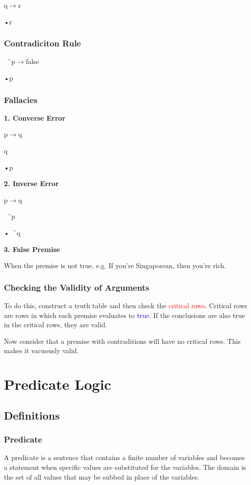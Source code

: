\documentclass{article}
\newcommand{\negation}{${\phantom{0}}^\sim$}
\begin{document}
q$\rightarrow$r

•r

\subsubsection{Contradiciton Rule}

\negation p$\rightarrow$false

•p

\subsubsection{Fallacies}
\textbf{1. Converse Error}

p$\rightarrow$q

q

•p

\vspace{10pt}
\textbf{2. Inverse Error}

p$\rightarrow$q

\negation p

•\negation q

\vspace{10pt}
\textbf{3. False Premise}

When the premise is not true, e.g. If you're Singaporean, then you're rich.

\subsubsection{Checking the Validity of Arguments}
To do this, construct a truth table and then check the \textcolor{red}{critical rows}. Critical rows are rows in which each premise evaluates to \textcolor{blue}{true}. If the conclusions are also true in the critical rows, they are valid.

Now consider that a premise with contraditions will have no critical rows. This makes it vacuously valid.

\section{Predicate Logic}
\subsection{Definitions}
\subsubsection{Predicate}
A predicate is a sentence that contains a finite number of variables and becomes a statement when specific values are substituted for the variables.
The domain is the set of all values that may be subbed in place of the variables.
\end{document}
